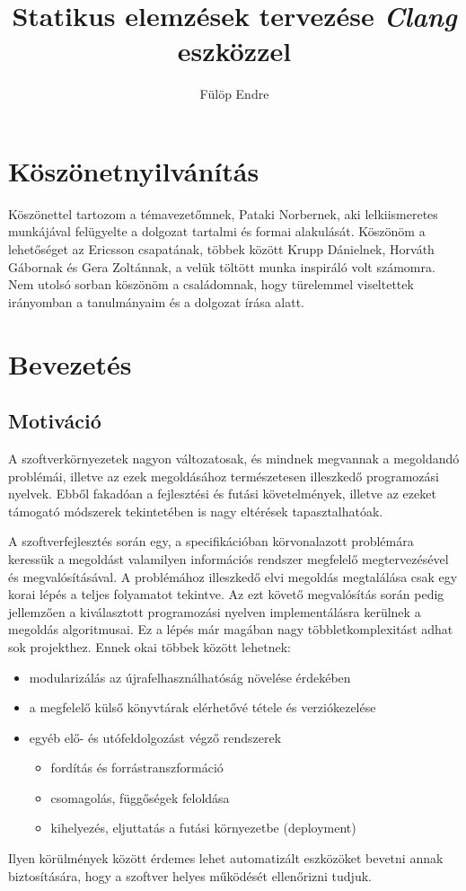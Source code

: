 \documentclass[a4paper,12pt]{report}
\title{Statikus elemzések tervezése \emph{Clang} eszközzel}
\author{Fülöp Endre}
\begin{document}


\tableofcontents

\chapter*{Köszönetnyilvánítás}
Köszönettel tartozom a témavezetőmnek, Pataki Norbernek, aki lelkiismeretes munkájával felügyelte a dolgozat tartalmi és formai alakulását. Köszönöm a lehetőséget az Ericsson csapatának, többek között Krupp Dánielnek, Horváth Gábornak és Gera Zoltánnak, a velük töltött munka inspiráló volt számomra. Nem utolsó sorban köszönöm a családomnak, hogy türelemmel viseltettek irányomban a tanulmányaim és a dolgozat írása alatt.

\chapter{Bevezetés}
\section{Motiváció}
A szoftverkörnyezetek nagyon változatosak, és mindnek megvannak a megoldandó problémái, illetve az ezek megoldásához természetesen illeszkedő programozási nyelvek. Ebből fakadóan a fejlesztési és futási követelmények, illetve az ezeket támogató módszerek tekintetében is nagy eltérések tapasztalhatóak.

A szoftverfejlesztés során egy, a specifikációban körvonalazott problémára keressük a megoldást valamilyen információs rendszer megfelelő megtervezésével és megvalósításával. A problémához illeszkedő elvi megoldás megtalálása csak egy korai lépés a teljes folyamatot tekintve. Az ezt követő megvalósítás során pedig jellemzően a kiválasztott programozási nyelven implementálásra kerülnek a megoldás algoritmusai. Ez a lépés már magában nagy többletkomplexitást adhat sok projekthez. Ennek okai többek között lehetnek:
\begin{itemize}
\item modularizálás az újrafelhasználhatóság növelése érdekében
\item a megfelelő külső könyvtárak elérhetővé tétele és verziókezelése
\item egyéb elő- és utófeldolgozást végző rendszerek
\begin{itemize}
\item fordítás és forrástranszformáció
\item csomagolás, függőségek feloldása
\item kihelyezés, eljuttatás a futási környezetbe (deployment)
\end{itemize}
\end{itemize}
Ilyen körülmények között érdemes lehet automatizált eszközöket bevetni annak biztosítására, hogy a szoftver helyes működését ellenőrizni tudjuk.
\end{document}
